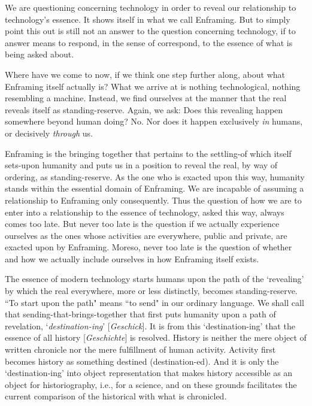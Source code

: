 \documentclass[paper=a4, fontsize=11pt,twoside]{scrartcl}
\begin{document}
\vspace{10mm}

We are questioning concerning technology in order to reveal our relationship to technology's essence. It shows itself in what we call Enframing. But to simply point this out is still not an answer to the question concerning technology, if to answer means to respond, in the sense of correspond, to the essence of what is being asked about.

Where have we come to now, if we think one step further along, about what Enframing itself actually is? What we arrive at is nothing technological, nothing resembling a machine. Instead, we find ourselves at the manner that the real reveals itself as standing-reserve. Again, we ask: Does this revealing happen somewhere beyond human doing? No. Nor does it happen exclusively \textit{in} humans, or decisively \textit{through} us.

Enframing is the bringing together that pertains to the settling-of which itself sets-upon humanity and puts us in a position to reveal the real, by way of ordering, as standing-reserve. As the one who is exacted upon this way, humanity stands within the essential domain of Enframing. We are incapable of assuming a relationship to Enframing only consequently. Thus the question of how we are to enter into a relationship to the essence of technology, asked this way, always comes too late. But never too late is the question if we actually experience ourselves as the ones whose activities are everywhere, public and private, are exacted upon by Enframing. Moreso, never too late is the question of whether and how we actually include ourselves in how Enframing itself exists.

The essence of modern technology starts humans upon the path of the `revealing' by which the real everywhere, more or less distinctly, becomes standing-reserve. ``To start upon the path" means ``to send" in our ordinary language. We shall call that sending-that-brings-together that first puts humanity upon a path of revelation, `\textit{destination-ing}' [\textit{Geschick}]. It is from this `destination-ing' that the essence of all history [\textit{Geschichte}] is resolved. History is neither the mere object of written chronicle nor the mere fulfillment of human activity. Activity first becomes history as something destined (destination-ed). And it is only the `destination-ing' into object representation that makes history accessible as an object for historiography, i.e., for a science, and on these grounds facilitates the current comparison of the historical with what is chronicled.
\end{document}
